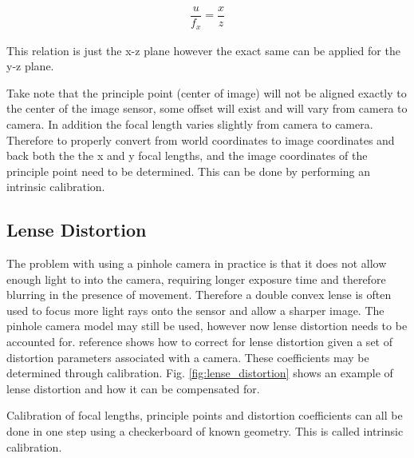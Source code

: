 \begin{align}
  \dfrac{u}{f_x} = \dfrac{x}{z}
\end{align}

This relation is just the x-z plane however the exact same can be applied for the y-z plane.   

Take note that the principle point (center of image) will not be aligned exactly to the center of the image sensor, some offset will exist and will vary from camera to camera.  In addition the focal length varies slightly from camera to camera.  Therefore to properly convert from world coordinates to image coordinates and back both the the x and y focal lengths, and the image coordinates of the principle point need to be determined.  This can be done by performing an intrinsic calibration.


\subsection{Lense Distortion}
\label{subsec:lense_distortion}

The problem with using a pinhole camera in practice is that it does not allow enough light to into the camera, requiring longer exposure time and therefore blurring in the presence of movement. Therefore a double convex lense is often used to focus more light rays onto the sensor and allow a sharper image.  The pinhole camera model may still be used, however now lense distortion needs to be accounted for.  reference shows how to correct for lense distortion given a set of distortion parameters associated with a camera.  These coefficients may be determined through calibration.  Fig. \ref{fig:lense_distortion} shows an example of lense distortion and how it can be compensated for.

Calibration of focal lengths, principle points and distortion coefficients can all be done in one step using a checkerboard of known geometry.  This is called intrinsic calibration.


